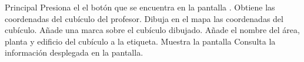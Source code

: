 \begin{UCtrayectoria}{Principal}
	\UCpaso[\UCactor] Presiona el el botón   que se encuentra en la pantalla  .
	\UCpaso Obtiene las coordenadas del cubículo del profesor.
	\UCpaso Dibuja en el mapa las coordenadas del cubículo.
	\UCpaso Añade una marca sobre el cubículo dibujado.
	\UCpaso Añade el nombre del área, planta y edificio del cubículo a la etiqueta.
	\UCpaso Muestra la pantalla 
	\UCpaso[\UCactor] Consulta la información desplegada en la pantalla.
\end{UCtrayectoria}

